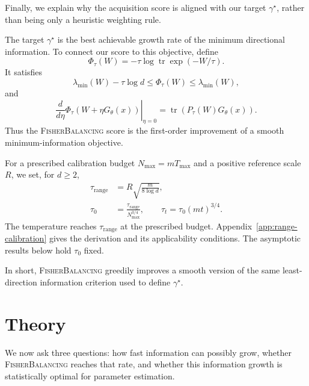 \documentclass[10pt,twoside,letterpaper]{article}
\newcommand{\tr}{\operatorname{tr}}
\newcommand{\FB}{\textnormal{\textsc{FisherBalancing}}}
\begin{document}
Finally, we explain why the acquisition score is aligned with our target
$\gamma^\star$, rather than being only a heuristic weighting rule.

The target $\gamma^\star$ is the best achievable growth rate of the
minimum directional information. To connect our score to this objective,
define
\begin{equation}
\Phi_\tau(W)
=
-\tau\log\tr\exp(-W/\tau).
\label{eq:potential}
\end{equation}
It satisfies
\begin{equation}
\lambda_{\min}(W)-\tau\log d
\le
\Phi_\tau(W)
\le
\lambda_{\min}(W),
\end{equation}
and
\begin{equation}
\left.
\frac{d}{d\eta}
\Phi_\tau
\left(
W+\eta G_\theta(x)
\right)
\right|_{\eta=0}
=
\tr\!\left(
P_\tau(W)G_\theta(x)
\right).
\label{eq:potential-gradient}
\end{equation}
Thus the \FB{} score is the first-order improvement of a smooth
minimum-information objective.

For a prescribed calibration budget $N_{\max}=mT_{\max}$ and a
positive reference scale $R$, we set, for $d\ge2$,
\begin{equation}
\begin{aligned}
\tau_{\mathrm{range}}
&=R\sqrt{\frac{m}{8\log d}},\\
\tau_0
&=\frac{\tau_{\mathrm{range}}}{N_{\max}^{3/4}},
\qquad
\tau_t=\tau_0(mt)^{3/4}.
\end{aligned}
\label{eq:temperature}
\end{equation}
The temperature reaches $\tau_{\mathrm{range}}$ at the prescribed
budget. Appendix~\ref{app:range-calibration} gives the derivation and
its applicability conditions. The asymptotic results below hold
$\tau_0$ fixed.

In short, \FB{} greedily improves a smooth version of the same
least-direction information criterion used to define
$\gamma^\star$.


\section{Theory}
\label{sec:theory}

We now ask three questions: how fast information can possibly grow,
whether \FB{} reaches that rate, and whether this information growth is
statistically optimal for parameter estimation.
\end{document}
